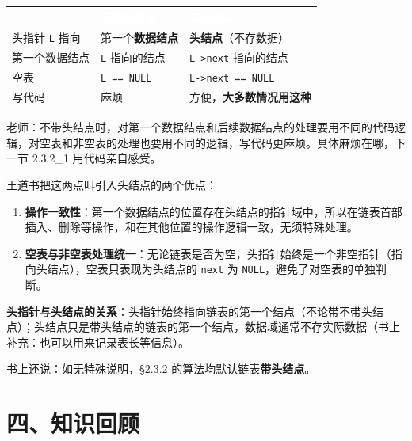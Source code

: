 \documentclass[10.5pt,a4paper,oneside]{article}
\newcommand{\hlred}[1]{\textcolor{wdred}{\bfseries #1}}
\providecommand{\tightlist}{\setlength{\itemsep}{2pt}\setlength{\parskip}{0pt}}
\begin{document}
{
\begin{xltabular}{\linewidth}{>{\hsize\raggedright\arraybackslash}X>{\hsize\raggedright\arraybackslash}X>{\hsize\raggedright\arraybackslash}X}
\textcolor{white}{\bfseries } & \textcolor{white}{\bfseries 不带头结点} & \textcolor{white}{\bfseries 带头结点} \\
\endfirsthead
头指针 \texttt{L} 指向 & 第一个\textbf{数据结点} & \textbf{头结点}（不存数据） \\ \hline
第一个数据结点 & \texttt{L} 指向的结点 & \texttt{L-\textgreater{}next} 指向的结点 \\ \hline
空表 & \texttt{L\ ==\ NULL} & \texttt{L-\textgreater{}next\ ==\ NULL} \\ \hline
写代码 & 麻烦 & 方便，\hlred{大多数情况用这种} \\ \hline
\end{xltabular}\par\vspace{4pt}}

老师：不带头结点时，对第一个数据结点和后续数据结点的处理要用不同的代码逻辑，对空表和非空表的处理也要用不同的逻辑，写代码更麻烦。具体麻烦在哪，下一节
2.3.2\_1 用代码亲自感受。

\begin{bookbox}

王道书把这两点叫引入头结点的两个优点：

\begin{enumerate}
\def\labelenumi{\arabic{enumi}.}
\tightlist
\item
  \textbf{操作一致性}：第一个数据结点的位置存在头结点的指针域中，所以在链表首部插入、删除等操作，和在其他位置的操作逻辑一致，无须特殊处理。
\item
  \textbf{空表与非空表处理统一}：无论链表是否为空，头指针始终是一个非空指针（指向头结点），空表只表现为头结点的
  \texttt{next} 为 \texttt{NULL}，避免了对空表的单独判断。
\end{enumerate}

\textbf{头指针与头结点的关系}：头指针始终指向链表的第一个结点（不论带不带头结点）；头结点只是带头结点的链表的第一个结点，数据域通常不存实际数据（书上补充：也可以用来记录表长等信息）。

书上还说：如无特殊说明，§2.3.2 的算法均默认链表\textbf{带头结点}。

\end{bookbox}

\hypertarget{ux56dbux77e5ux8bc6ux56deux987e}{%
\section{四、知识回顾}\label{ux56dbux77e5ux8bc6ux56deux987e}}
\end{document}
